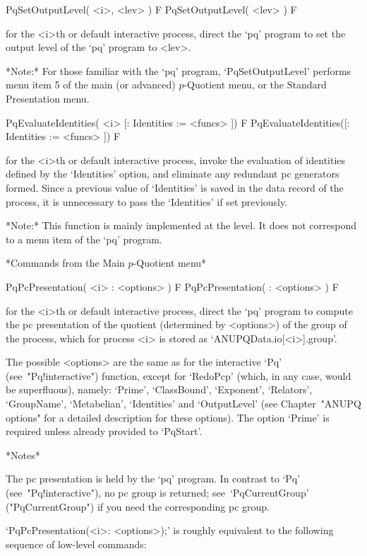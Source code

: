 \>PqSetOutputLevel( <i>, <lev> ) F
\>PqSetOutputLevel( <lev> ) F

for the <i>th or default interactive {\ANUPQ} process,  direct  the  `pq'
program to set the output level of the `pq' program to <lev>.

*Note:* For those  familiar  with  the  `pq'  program,  `PqSetOutputLevel'
performs menu item 5 of the main (or advanced) $p$-Quotient menu, or  the
Standard Presentation menu.

\>PqEvaluateIdentities( <i> [: Identities := <funcs> ]) F
\>PqEvaluateIdentities([: Identities := <funcs> ]) F

for the  <i>th  or  default  interactive  {\ANUPQ}  process,  invoke  the
evaluation  of  identities  defined  by  the  `Identities'  option,   and
eliminate any redundant pc generators formed. Since a previous  value  of
`Identities'  is  saved  in  the  data  record  of  the  process,  it  is
unnecessary to pass the `Identities' if set previously.

*Note:* This function is mainly implemented at the {\GAP} level. It  does
not correspond to a menu item of the `pq' program.

\goodbreak%
*Commands from the Main $p$-Quotient menu*

\>PqPcPresentation( <i> : <options> ) F
\>PqPcPresentation( : <options> ) F

for the <i>th or default interactive {\ANUPQ} process,  direct  the  `pq'
program to compute the pc presentation of  the  quotient  (determined  by
<options>) of the group of the process, which for process <i>  is  stored
as `ANUPQData.io[<i>].group'.

The  possible  <options>  are  the  same  as  for  the  interactive  `Pq'
(see~"Pq!interactive") function, except  for  `RedoPcp'  (which,  in  any
case, would be superfluous), namely: `Prime',  `ClassBound',  `Exponent',
`Relators', `GroupName',  `Metabelian',  `Identities'  and  `OutputLevel'
(see  Chapter~"ANUPQ  options"  for  a  detailed  description  for  these
options). The option `Prime'  is  required  unless  already  provided  to
`PqStart'.

*Notes* 

The pc presentation is held by the `pq'  program.  In  contrast  to  `Pq'
(see~"Pq!interactive"),    no    {\GAP}    pc    group    is    returned;
see~`PqCurrentGroup' ("PqCurrentGroup") if  you  need  the  corresponding
{\GAP} pc group.

`PqPcPresentation(<i>:  <options>);'  is  roughly   equivalent   to   the
following sequence of low-level commands:

